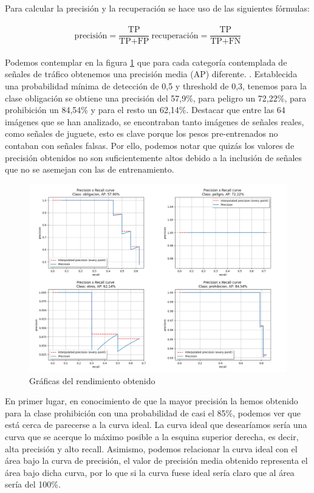 Para calcular la precisión y la recuperación se hace uso de las siguientes fórmulas:\\
\\
$$\text{precisión} = \frac{\text{TP}}{\text{TP} + \text{FP}}\ \text{recuperación} = \frac{\text{TP}}{\text{TP} + \text{FN}}$$
\\

Podemos contemplar en la figura \ref{rendimiento} que para cada categoría contemplada de señales de tráfico obtenemos una precisión media (AP) diferente. . Establecida una probabilidad mínima de detección de 0,5 y threshold de 0,3, tenemos para la clase obligación se obtiene una precisión del 57,9\%, para peligro un 72,22\%, para prohibición un 84,54\% y para el resto un 62,14\%. Destacar que entre las 64 imágenes que se han analizado, se encontraban tanto imágenes de señales reales, como señales de juguete, esto es clave porque los pesos pre-entrenados no contaban con señales falsas. Por ello, podemos notar que quizás los valores de precisión obtenidos no son suficientemente altos debido a la inclusión de señales que no se asemejan con las de entrenamiento.\\

\begin{figure}[H]
    \centering
 	\includegraphics[width=\textwidth]{Imagenes/IA/rendimiento.pdf}
    \caption{Gráficas del rendimiento obtenido}
    \label{rendimiento}
\end{figure}

En primer lugar, en conocimiento de que la mayor precisión la hemos obtenido para la clase prohibición con una probabilidad de casi el 85\%, podemos ver que está cerca de parecerse a la curva ideal. La curva ideal que desearíamos sería una curva que se acerque lo máximo posible a la esquina superior derecha, es decir, alta precisión y alto recall. Asimismo, podemos relacionar la curva ideal con el área bajo la curva de precisión, el valor de precisión media obtenido representa el área bajo dicha curva, por lo que si la curva fuese ideal sería claro que al área sería del 100\%.\\

